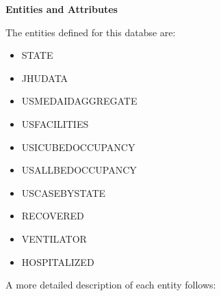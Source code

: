 \documentclass[11pt]{article}
\begin{document}
\pagebreak

\noindent
\textbf{Entities and Attributes}

\noindent
The entities defined for this databse are: \\

\begin{itemize}
    \item STATE
    \item JHUDATA
    \item USMEDAIDAGGREGATE
    \item USFACILITIES
    \item USICUBEDOCCUPANCY
    \item USALLBEDOCCUPANCY
    \item USCASEBYSTATE
    \item RECOVERED
    \item VENTILATOR
    \item HOSPITALIZED
\end{itemize}

\noindent
A more detailed description of each entity follows:
\end{document}
